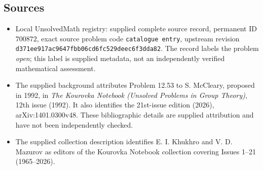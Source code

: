 \documentclass[11pt]{article}
\begin{document}
\subsection{Sources}
\begin{itemize}
\item Local UnsolvedMath registry: supplied complete source record, permanent ID \(700872\), exact source problem code \texttt{catalogue entry}, upstream revision \texttt{d371ee917ac9647fbb06cd6fc529deec6f3dda82}. The record labels the problem \emph{open}; this label is supplied metadata, not an independently verified mathematical assessment.
\item The supplied background attributes Problem 12.53 to S. McCleary, proposed in 1992, in \emph{The Kourovka Notebook (Unsolved Problems in Group Theory)}, 12th issue (1992). It also identifies the 21st-issue edition (2026), arXiv:1401.0300v48. These bibliographic details are supplied attribution and have not been independently checked.
\item The supplied collection description identifies E. I. Khukhro and V. D. Mazurov as editors of the Kourovka Notebook collection covering Issues 1--21 (1965--2026).
\end{itemize}
\end{document}
